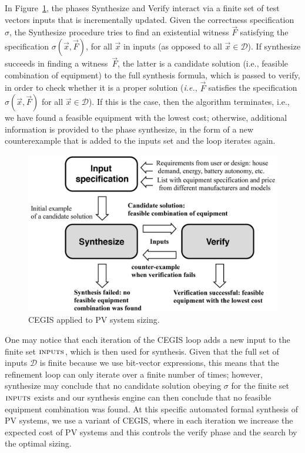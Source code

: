 \documentclass[review]{elsarticle}
\begin{document}
In Figure~\ref{Counter-Example-Guided-Inductive-Synthesis}, the phases {\sc Synthesize} and {\sc Verify} interact via a finite set of test vectors {\sc inputs} that is incrementally updated. Given the correctness specification $\sigma$, the {\sc Synthesize} procedure tries to find an existential witness $\vec{F}$ satisfying the specification $\sigma(\vec{x}, \vec{F})$, for all $\vec{x}$ in {\sc inputs} (as opposed to all $\vec{x} \in \mathcal{D}$). If {\sc synthesize} succeeds in finding a witness~$\vec{F}$, the latter is a candidate solution (i.e., feasible combination of equipment) to the full synthesis formula, which is passed to {\sc verify}, in order to check whether it is a proper solution ({\it i.e.}, $\vec{F}$ satisfies the specification $\sigma(\vec{x}, \vec{F})$ for all $\vec{x}\in\mathcal{D}$). If this is the case, then the algorithm terminates, i.e., we have found a feasible equipment with the lowest cost; otherwise, additional information is provided to the phase {\sc synthesize}, in the form of a new counterexample that is added to the {\sc inputs} set and the loop iterates again. 
%
\begin{figure}[h]
	\centering
	\includegraphics[width=0.85\columnwidth]{fig2_rev.jpg}
	\caption{CEGIS applied to PV system sizing.}
	\label{Counter-Example-Guided-Inductive-Synthesis}
\end{figure}
%
One may notice that each iteration of the CEGIS loop adds a new input to the finite set $\text{\sc inputs}$, which is then used for synthesis.  Given that the full set of inputs $\mathcal{D}$ is finite because we use bit-vector expressions, this means that the refinement loop can only iterate over a finite number of times; however, {\sc synthesize} may conclude that no candidate solution obeying $\sigma$ for the finite set $\text{\sc inputs}$ exists and our synthesis engine can then conclude that no feasible equipment combination was found. At this specific automated formal synthesis of PV systems, we use a variant of CEGIS, where in each iteration we increase the expected cost of PV systems and this controls the {\sc verify} phase and the search by the optimal sizing.  %
\end{document}

